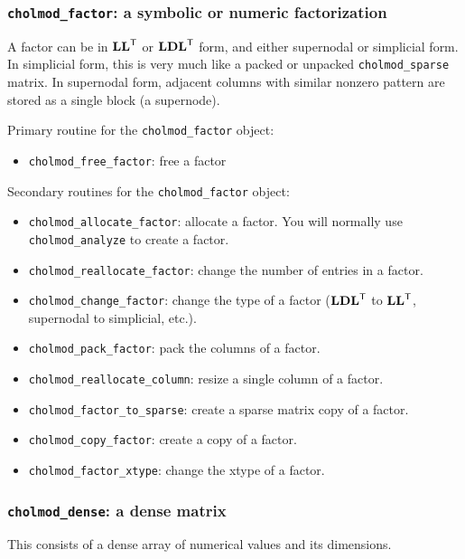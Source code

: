 \documentclass[11pt]{article}
\newcommand{\m}[1]{{\bf{#1}}}       %
\newcommand{\tr}{^{\sf T}}          %
\begin{document}
\newpage \subsubsection{{\tt cholmod\_factor}: a symbolic or numeric factorization}

    A factor can be in $\m{LL}\tr$ or $\m{LDL}\tr$ form, and either supernodal
    or simplicial form.  In simplicial form, this is very much like a
    packed or unpacked {\tt cholmod\_sparse} matrix.  In supernodal
    form, adjacent columns with similar nonzero pattern are stored as
    a single block (a supernode).

\vspace{0.1in}
\noindent Primary routine for the {\tt cholmod\_factor} object:
    \begin{itemize}
    \item {\tt cholmod\_free\_factor}: free a factor
    \end{itemize}

\noindent Secondary routines for the {\tt cholmod\_factor} object:
    \begin{itemize}
    \item {\tt cholmod\_allocate\_factor}: allocate a factor.  You will normally use {\tt cholmod\_analyze} to create a factor.
    \item {\tt cholmod\_reallocate\_factor}: change the number of entries in a factor.
    \item {\tt cholmod\_change\_factor}: change the type of a factor ($\m{LDL}\tr$ to $\m{LL}\tr$, supernodal to simplicial, etc.).
    \item {\tt cholmod\_pack\_factor}: pack the columns of a factor.
    \item {\tt cholmod\_reallocate\_column}: resize a single column of a factor.
    \item {\tt cholmod\_factor\_to\_sparse}: create a sparse matrix copy of a factor.
    \item {\tt cholmod\_copy\_factor}: create a copy of a factor.
    \item {\tt cholmod\_factor\_xtype}: change the xtype of a factor.
    \end{itemize}

\subsubsection{{\tt cholmod\_dense}: a dense matrix}
    This consists of a dense array of numerical values and its dimensions.
\end{document}
